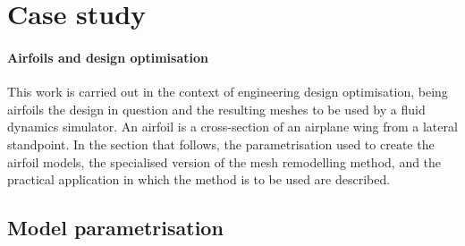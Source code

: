 \section{Case study}

\paragraph{Airfoils and design optimisation} This work is carried out in the context of engineering design optimisation, being airfoils the design in question and the resulting meshes to be used by a fluid dynamics simulator. An airfoil is a cross-section of an airplane wing from a lateral standpoint. In the section that follows, the parametrisation used to create the airfoil models, the specialised version of the mesh remodelling method, and the practical application in which the method is to be used are described.

\subsection{Model parametrisation}

